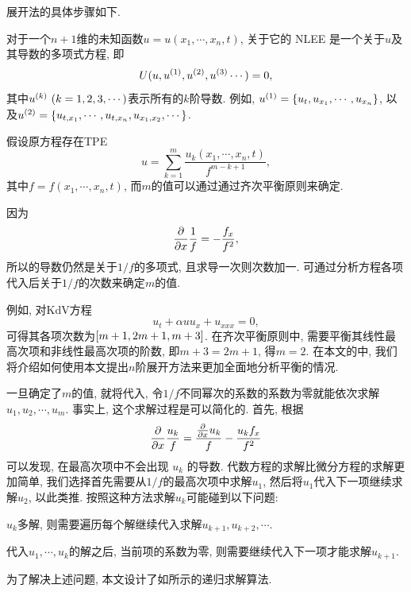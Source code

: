 \Painleve{}展开法的具体步骤如下. 

对于一个$n+1$维的未知函数$u=u(x_1,\cdots,x_n,t)$, 关于它的 NLEE 是一个关于$u$及其导数的多项式方程, 即
\begin{equation}
    U(u,u^{(1)},u^{(2)},u^{(3)}\cdots)=0, \label{oeq}
\end{equation}
其中$u^{(k)}~(k=1,2,3,\cdots)$表示所有的$k$阶导数. 例如, $u^{(1)}=\left\{u_t,u_{x_1},\cdots,u_{x_n}\right\}$, 以及$u^{(2)}=\left\{u_{t,x_1},\cdots,u_{t,x_n},u_{x_1,x_2},\cdots\right\}$.

假设原方程存在TPE
\begin{equation}
    u=\sum_{k=1}^{m}{\frac{u_k(x_1,\cdots,x_n,t)}{f^{m-k+1}}},  \label{tr}
\end{equation}
其中$f=f(x_1,\cdots,x_n,t)$, 而$m$的值可以通过通过齐次平衡原则来确定. 

因为
\begin{equation}
    \frac{\partial}{\partial x}\frac{1}{f}=-\frac{f_x}{f^2},
\end{equation}
所以的导数仍然是关于$1/f$的多项式, 且求导一次则次数加一. 可通过分析方程各项代入后关于$1/f$的次数来确定$m$的值.

例如, 对KdV方程\CITEaaKdV{}
\begin{equation}
    u_t+\alpha uu_x+u_{xxx}=0,
\end{equation}
可得其各项次数为$\left[m+1,2m+1,m+3\right]$. 在齐次平衡原则中, 需要平衡其线性最高次项和非线性最高次项的阶数, 即$m+3=2m+1$, 得$m=2$. 在本文的中, 我们将介绍如何使用本文提出$n$阶展开方法来更加全面地分析平衡的情况. 

一旦确定了$m$的值, 就将代入, 令$1/f$不同幂次的系数的系数为零就能依次求解$u_1,u_2,\cdots,u_m$. 事实上, 这个求解过程是可以简化的. 首先, 根据 
\begin{equation}
    \frac{\partial}{\partial x}\frac{u_k}{f}=\frac{\frac{\partial}{\partial x}u_k}{f}-\frac{u_kf_x}{f^2}
\end{equation} 
可以发现, 在最高次项中不会出现 $u_k$ 的导数. 代数方程的求解比微分方程的求解更加简单, 我们选择首先需要从$1/f$的最高次项中求解$u_1$, 然后将$u_1$代入下一项继续求解$u_2$, 以此类推. 按照这种方法求解$u_k$可能碰到以下问题: 
\begin{compactenum}[(1)]
\item $u_k$多解, 则需要遍历每个解继续代入求解$u_{k+1},u_{k+2},\cdots$.
\item 代入$u_1,\cdots,u_k$的解之后, 当前项的系数为零, 则需要继续代入下一项才能求解$u_{k+1}$. 
\end{compactenum}
为了解决上述问题, 本文设计了如所示的递归求解算法. 

